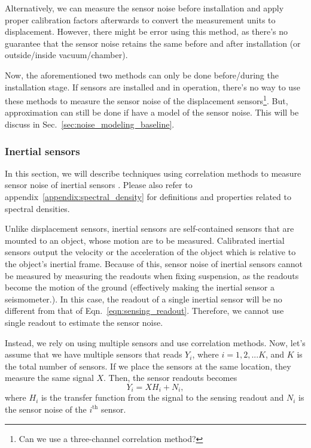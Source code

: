 Alternatively, we can measure the sensor noise before installation and apply proper calibration factors afterwards to convert the measurement units to displacement.
However, there might be error using this method, as there's no guarantee that the sensor noise retains the same before and after installation (or outside/inside vacuum/chamber).

Now, the aforementioned two methods can only be done before/during the installation stage.
If sensors are installed and in operation, there's no way to use these methods to measure the sensor noise of the displacement sensors\footnote{Can we use a three-channel correlation method?}.
But, approximation can still be done if have a model of the sensor noise.
This will be discuss in Sec.~\ref{sec:noise_modeling_baseline}.

\subsubsection{Inertial sensors}
In this section, we will describe techniques using correlation methods to measure sensor noise of inertial sensors \cite{technique_for_measurement_of_the_noise, Sleeman2006ThreeChannelCA}. Please also refer to appendix~\ref{appendix:spectral_density} for definitions and properties related to spectral densities.

Unlike displacement sensors, inertial sensors are self-contained sensors that are mounted to an object, whose motion are to be measured.
Calibrated inertial sensors output the velocity or the acceleration of the object which is relative to the object's inertial frame.
Because of this, sensor noise of inertial sensors cannot be measured by measuring the readouts when fixing suspension, as the readouts become the motion of the ground (effectively making the inertial sensor a seismometer.).
In this case, the readout of a single inertial sensor will be no different from that of Eqn.~\eqref{eqn:sensing_readout}.
Therefore, we cannot use single readout to estimate the sensor noise.

Instead, we rely on using multiple sensors and use correlation methods.
Now, let's assume that we have multiple sensors that reads $Y_i$, where $i=1,2,...K$, and $K$ is the total number of sensors.
If we place the sensors at the same location, they measure the same signal $X$.
Then, the sensor readouts becomes
\begin{equation}
	Y_i = XH_i + N_i,
\end{equation}
where $H_i$ is the transfer function from the signal to the sensing readout and $N_i$ is the sensor noise of the $i^\mathrm{th}$ sensor.

